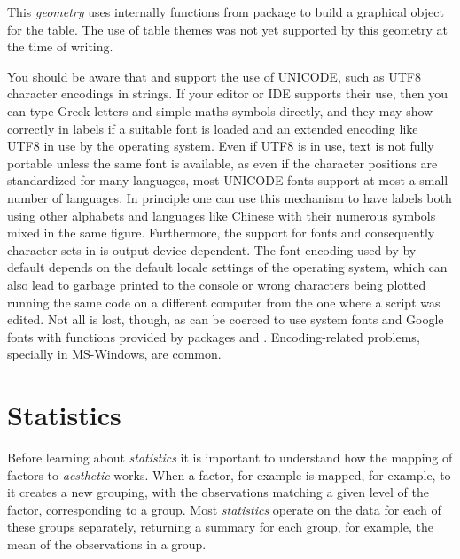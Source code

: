 \documentclass[krantz2]{krantz}\usepackage{knitr}%
\begin{document}
\begin{explainbox}
  This \emph{geometry} uses internally functions from package  to build a graphical object for the table. The use of table themes was not yet supported by this geometry at the time of writing.
\end{explainbox}

\begin{warningbox}
You should be aware that \Rlang and \ggplot support the use of UNICODE, such as UTF8 character encodings in strings. If your editor or IDE supports their use, then you can type Greek letters and simple maths symbols directly, and they may show correctly in labels if a suitable font is loaded and an extended encoding like UTF8 in use by the operating system. Even if UTF8 is in use, text is not fully portable unless the same font is available, as even if the character positions are standardized for many languages, most UNICODE fonts support at most a small number of languages. In principle one can use this mechanism to have labels both using other alphabets and languages like Chinese with their numerous symbols mixed in the same figure. Furthermore, the support for fonts and consequently character sets in \Rlang is output-device dependent. The font encoding used by \Rlang by default depends on the default locale settings of the operating system, which can also lead to garbage printed to the console or wrong characters being plotted running the same code on a different computer from the one where a script was edited. Not all is lost, though, as \Rlang can be coerced to use system fonts and Google fonts with functions provided by packages  and . Encoding-related problems, specially in MS-Windows, are common.
\end{warningbox}



\section{Statistics}\label{sec:plot:statistics}

Before learning about \ggplot \emph{statistics} it is important to understand how the mapping of factors to \emph{aesthetic} works. When a factor, for example is mapped, for example, to  it creates a new grouping, with the observations matching a given level of the factor, corresponding to a group. Most \emph{statistics} operate on the data for each of these groups separately, returning a summary for each group, for example, the mean of the observations in a group.
\end{document}

